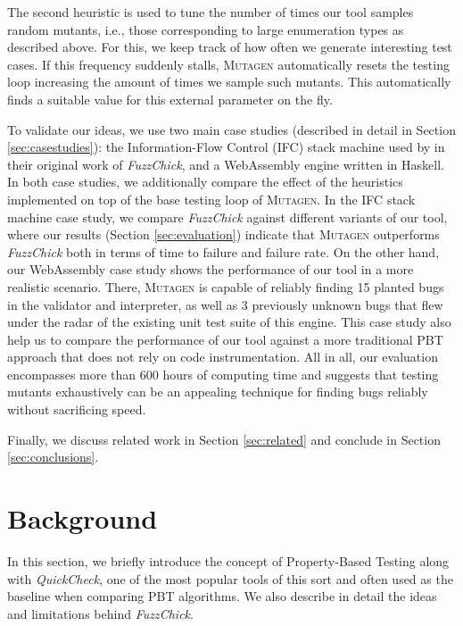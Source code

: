 \documentclass[acmsmall, anonymous]{acmart}
\newcommand{\quickcheck}{\textit{QuickCheck}\xspace}
\newcommand{\fuzzchick}{\textit{FuzzChick}\xspace}
\newcommand{\mutagen}{\textsc{Mutagen}\xspace}
\begin{document}
The second heuristic is used to tune the number of times our tool samples random
mutants, i.e., those corresponding to large enumeration types as described above.
%
For this, we keep track of how often we generate interesting test cases.
%
If this frequency suddenly stalls, \mutagen automatically resets the testing
loop increasing the amount of times we sample such mutants.
%
This automatically finds a suitable value for this external parameter on the
fly.


To validate our ideas, we use two main case studies (described in detail in
Section \ref{sec:casestudies}): the Information-Flow Control (IFC) stack machine
used by \citeauthor{lampropoulos2019coverage} in their original work of
\fuzzchick, and a WebAssembly engine written in Haskell.
%
In both case studies, we additionally compare the effect of the heuristics
implemented on top of the base testing loop of \mutagen.
%
In the IFC stack machine case study, we compare \fuzzchick against different
variants of our tool, where our results (Section \ref{sec:evaluation}) indicate
that \mutagen outperforms \fuzzchick both in terms of time to failure and
failure rate.
%
On the other hand, our WebAssembly case study shows the performance of our tool
in a more realistic scenario.
%
There, \mutagen is capable of reliably finding 15 planted bugs in the validator
and interpreter, as well as 3 previously unknown bugs that flew under the radar
of the existing unit test suite of this engine.
%
This case study also help us to compare the performance of our tool against a
more traditional PBT approach that does not rely on code instrumentation.
%
All in all, our evaluation encompasses more than 600 hours of computing time and
suggests that testing mutants exhaustively can be an appealing technique for
finding bugs reliably without sacrificing speed.


Finally, we discuss related work in Section \ref{sec:related} and conclude
in Section \ref{sec:conclusions}.



\vspace{-5pt}

\section{Background}
\label{sec:background}

In this section, we briefly introduce the concept of Property-Based Testing
along with \quickcheck, one of the most popular tools of this sort and often
used as the baseline when comparing PBT algorithms.
%
We also describe in detail the ideas and limitations behind \fuzzchick.
\end{document}
